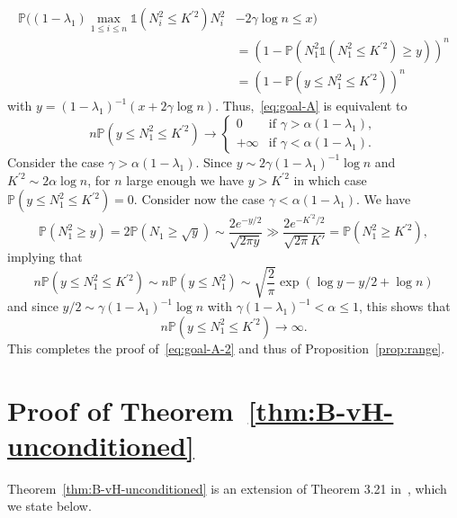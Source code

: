 \documentclass[]{article}
\newcommand{\Indicator}[1]{\mathds{1}\left(#1\right)}
\renewcommand{\P}{\mathbb{P}}
\theoremstyle{plain}
\theoremstyle{definition}
\begin{document}
\begin{align*}
	\P \Big( (1-\lambda_1) \max_{1 \leq i \leq n} \Indicator{N_i^2 \leq K^{\prime 2}} N_i^2 & - 2 \gamma \log n \leq x \Big)\\
	& = \left( 1 - \P \left( N^2_1 \Indicator{N^2_1 \leq K^{\prime 2}} \geq y \right) \right)^n\\
	& = \left( 1 - \P \left( y \leq N^2_1 \leq K^{\prime 2} \right) \right)^n
\end{align*}
with $y = (1-\lambda_1)^{-1} (x + 2 \gamma \log n)$. Thus,~\eqref{eq:goal-A} is equivalent to
\begin{equation} \label{eq:goal-A-2}
	n \P \left( y \leq N^2_1 \leq K^{\prime 2} \right) \to \left\{ \begin{array}{ll}
		0 & \text{if } \gamma > \alpha (1-\lambda_1),\\
		+\infty & \text{if } \gamma < \alpha (1-\lambda_1).
	\end{array} \right.
\end{equation}
Consider the case $\gamma > \alpha (1-\lambda_1)$. Since $y \sim 2 \gamma (1-\lambda_1)^{-1} \log n$ and $K^{\prime 2} \sim 2 \alpha \log n$, for $n$ large enough we have $y > K^{\prime 2}$ in which case $\P(y \leq N^2_1 \leq K^{\prime 2}) = 0$. Consider now the case $\gamma < \alpha (1-\lambda_1)$. We have
\[ \P \left( N^2_1 \geq y \right) = 2 \P \left( N_1 \geq \sqrt{y} \right) \sim \frac{2 e^{-y/2}}{\sqrt{2\pi y}} \gg \frac{2 e^{-K^{\prime 2}/2}}{\sqrt{2\pi} K'} = \P \left( N^2_1 \geq K^{\prime 2} \right), \]
implying that
\[ n \P \left( y \leq N^2_1 \leq K^{\prime 2} \right) \sim n \P \left( y \leq N^2_1 \right) \sim \sqrt{\frac{2}{\pi}} \exp \left( \log y - y/2 + \log n \right) \]
and since $y/2 \sim \gamma (1-\lambda_1)^{-1} \log n$ with $\gamma (1 - \lambda_1)^{-1} < \alpha \leq 1$, this shows that
\[ n \P \left( y \leq N^2_1 \leq K^{\prime 2} \right) \to \infty. \]
This completes the proof of~\eqref{eq:goal-A-2} and thus of Proposition~\ref{prop:range}.





\appendix

\section{Proof of Theorem~\ref{thm:B-vH-unconditioned}} \label{appendix}

Theorem~\ref{thm:B-vH-unconditioned} is an extension of Theorem 3.21 in~\cite{Brailovskaya24-0}, which we state below.
\end{document}
